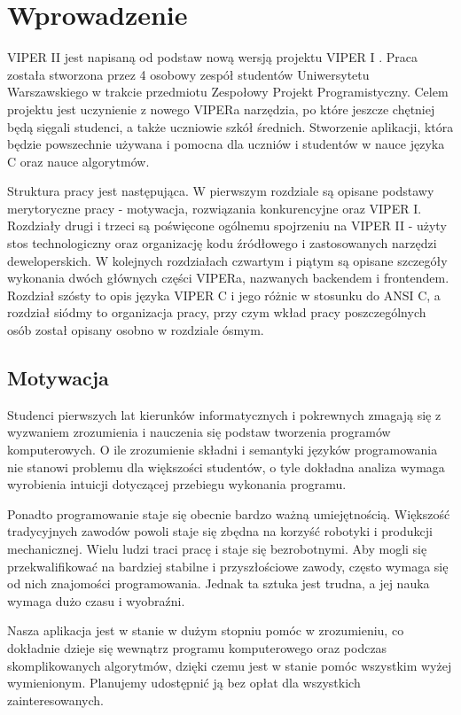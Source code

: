 \documentclass[a4paper,twoside,openright,11pt]{report}
\begin{document}
  \tableofcontents

  \chapter{Wprowadzenie}
\par VIPER II jest napisaną od podstaw nową wersją projektu VIPER I \cite{viper1}. Praca została stworzona przez 4 osobowy zespół studentów Uniwersytetu Warszawskiego w trakcie przedmiotu Zespołowy Projekt Programistyczny. Celem projektu jest uczynienie z nowego VIPERa narzędzia, po które jeszcze chętniej będą sięgali studenci, a także uczniowie szkół średnich. Stworzenie aplikacji, która będzie powszechnie używana i pomocna dla uczniów i studentów w nauce języka C oraz nauce algorytmów. 
\par Struktura pracy jest następująca. W pierwszym rozdziale są opisane podstawy merytoryczne pracy - motywacja, rozwiązania konkurencyjne oraz VIPER I. Rozdziały drugi i trzeci są poświęcone ogólnemu spojrzeniu na VIPER II - użyty stos technologiczny oraz organizację kodu źródłowego i zastosowanych narzędzi deweloperskich. W kolejnych rozdziałach czwartym i piątym są opisane szczegóły wykonania dwóch głównych części VIPERa, nazwanych backendem i frontendem. Rozdział szósty to opis języka VIPER C i jego różnic w stosunku do ANSI C, a rozdział siódmy to organizacja pracy, przy czym wkład pracy poszczególnych osób został opisany osobno w rozdziale ósmym.

  \section{Motywacja}
\par Studenci pierwszych lat kierunków informatycznych i pokrewnych zmagają się z wyzwaniem zrozumienia i nauczenia się podstaw tworzenia programów komputerowych. O ile zrozumienie składni i semantyki języków programowania nie stanowi problemu dla większości studentów, o tyle dokładna analiza wymaga wyrobienia intuicji dotyczącej przebiegu wykonania programu.
\par Ponadto programowanie staje się obecnie bardzo ważną umiejętnością. Większość tradycyjnych zawodów powoli staje się zbędna na korzyść robotyki i produkcji mechanicznej. Wielu ludzi traci pracę i staje się bezrobotnymi. Aby mogli się przekwalifikować na bardziej stabilne i przyszłościowe zawody, często wymaga się od nich znajomości programowania. Jednak ta sztuka jest trudna, a jej nauka wymaga dużo czasu i wyobraźni. 
\par Nasza aplikacja jest w stanie w dużym stopniu pomóc w zrozumieniu, co dokładnie dzieje się wewnątrz programu komputerowego oraz podczas skomplikowanych algorytmów, dzięki czemu jest w stanie pomóc wszystkim wyżej wymienionym. Planujemy udostępnić ją bez opłat dla wszystkich zainteresowanych.
\end{document}
